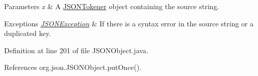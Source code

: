 \begin{DoxyParams}{Parameters}
{\em x} & A \hyperlink{classorg_1_1json_1_1_j_s_o_n_tokener}{J\-S\-O\-N\-Tokener} object containing the source string. \\
\hline
\end{DoxyParams}

\begin{DoxyExceptions}{Exceptions}
{\em \hyperlink{classorg_1_1json_1_1_j_s_o_n_exception}{J\-S\-O\-N\-Exception}} & If there is a syntax error in the source string or a duplicated key. \\
\hline
\end{DoxyExceptions}


Definition at line 201 of file J\-S\-O\-N\-Object.\-java.



References org.\-json.\-J\-S\-O\-N\-Object.\-put\-Once().


